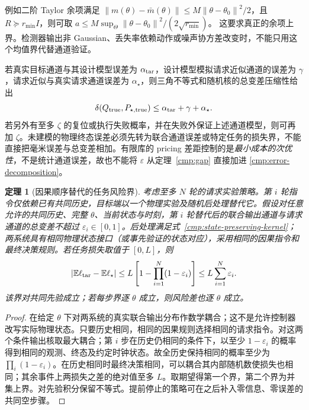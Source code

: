 \documentclass[11pt,a4paper]{article}
\numberwithin{equation}{section}
\newtheorem{theorem}{定理}[section]
\theoremstyle{definition}
\newcommand{\E}{\mathbb E}
\newcommand{\norm}[1]{\left\lVert#1\right\rVert}
\newcommand{\abs}[1]{\left\lvert#1\right\rvert}
\begin{document}
例如二阶 Taylor 余项满足
$\norm{m(\theta)-\bar m(\theta)}\le M\norm{\theta-\theta_0}^2/2$，且 $R\succeq r_{\min}I$，则可取
$a\le M\sup_{\Theta}\norm{\theta-\theta_0}^2/(2\sqrt{r_{\min}})$。
这要求真正的余项上界。检测器输出非 Gaussian、丢失率依赖动作或噪声协方差改变时，不能只用这个均值界代替通道验证。

若真实目标通道与其设计模型误差为 $\alpha_{\rm tar}$，设计模型模拟请求近似通道的误差为 $\gamma$，请求近似与真实请求通道误差为 $\alpha_\star$，则三角不等式和随机核的总变差压缩性给出
\begin{equation}
 \delta(Q_{\rm true},P_{\star,\rm true})
 \le \alpha_{\rm tar}+\gamma+\alpha_\star.
 \label{cmp:error-decomposition}
\end{equation}
若另外有至多 $\zeta$ 的复位或执行失败概率，并在失败外保证上述通道模型，则可再加 $\zeta$。未建模的物理终态误差必须先转为联合通道误差或特定任务的损失界，不能直接把毫米误差与总变差相加。有限库的 pricing 差距控制的是\emph{最小成本的次优性}，不是统计通道误差，故也不能将 $\varepsilon$ 从定理~\ref{cmp:gap} 直接加进 \eqref{cmp:error-decomposition}。

\begin{theorem}[因果顺序替代的任务风险界]
\label{cmp:sequential-risk}
考虑至多 $N$ 轮的请求实验策略。第 $i$ 轮指令仅依赖已有共同历史，目标端以一个物理实验及随机后处理替代它。假设对任意允许的共同历史、完整 $\theta$、当前状态与时刻，第 $i$ 轮替代后的\emph{联合}输出通道与请求通道的总变差不超过 $\varepsilon_i\in[0,1]$。后处理满足式~\eqref{cmp:state-preserving-kernel}；两系统具有相同物理状态接口（或事先验证的状态对应），采用相同的因果指令和最终决策规则。若任务损失取值于 $[0,L]$，则
\begin{equation}
 \abs{\E\ell_{\rm tar}-\E\ell_\star}
 \le L\left[1-\prod_{i=1}^N(1-\varepsilon_i)\right]
 \le L\sum_{i=1}^N\varepsilon_i.
 \label{cmp:sequential-bound}
\end{equation}
该界对共同先验成立；若每步界逐 $\theta$ 成立，则风险差也逐 $\theta$ 成立。
\end{theorem}
\begin{proof}
在给定 $\theta$ 下对两系统的真实联合输出分布作数学耦合；这不是允许控制器改写实际物理状态。只要历史相同，相同的因果规则选择相同的请求指令。对这两个条件输出核取最大耦合；第 $i$ 步在历史仍相同的条件下，以至少 $1-\varepsilon_i$ 的概率得到相同的观测、终态及约定时钟状态。故全历史保持相同的概率至少为 $\prod_i(1-\varepsilon_i)$。在历史相同时最终决策相同，可以耦合其内部随机数使损失也相同；其余事件上两损失之差的绝对值至多 $L$。取期望得第一个界，第二个界为并集上界。对先验积分保留不等式。提前停止的策略可在之后补入零信息、零误差的共同空步骤。
\end{proof}
\end{document}
